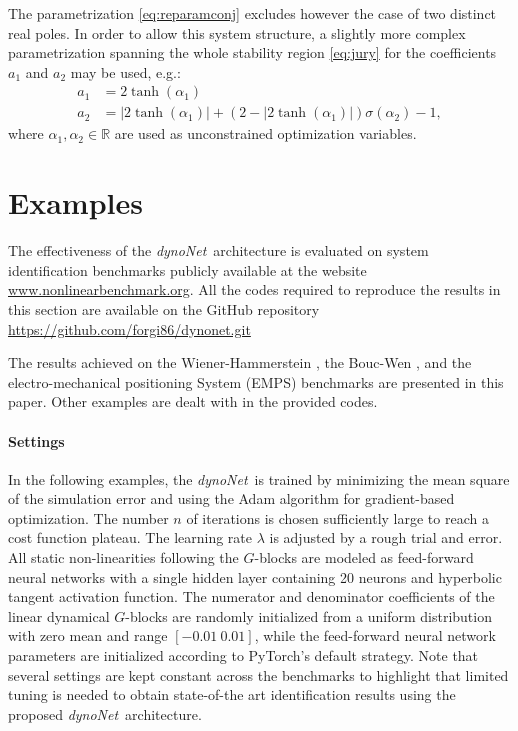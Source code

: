 \documentclass{article}
\newcommand{\ac}{a} %
\newcommand{\Name}{\emph{dynoNet}}
\begin{document}
The parametrization \eqref{eq:reparamconj} excludes however the case of two distinct real poles. 
In order to allow this system structure, a slightly more complex parametrization spanning the whole stability region \eqref{eq:jury} for the coefficients $a_1$ and $a_2$  may be used, e.g.:
\begin{subequations}
	\label{eq:reparamgen}
	\begin{align}
	\ac_1 &= 2 \tanh(\alpha_1)\\
	\ac_2 &= |2 \tanh(\alpha_1)| + (2 - |2 \tanh(\alpha_1)|)  \sigma(\alpha_2) - 1,
	\end{align}
\end{subequations}
where $\alpha_1, \alpha_2 \in \mathbb{R}$ are used as unconstrained optimization variables.


\section{Examples}
\label{sec:examples}
The effectiveness of the  \Name\ architecture is evaluated on  system identification benchmarks publicly available at the website \url{www.nonlinearbenchmark.org}.
All the codes required to reproduce the results in this section are available on the GitHub repository \url{https://github.com/forgi86/dynonet.git}

The results achieved on the Wiener-Hammerstein \cite{ljung2009wiener}, the Bouc-Wen \cite{noel2016hysteretic}, and the electro-mechanical positioning System (EMPS) \cite{janot2019data} benchmarks are presented in this paper. 
Other examples are dealt with in the provided codes.


\paragraph{Settings}
In the following examples, the \Name\ is trained by minimizing the mean square of the simulation error and  using the Adam algorithm \cite{kingma2014adam} for gradient-based optimization. The number $n$ of iterations  is chosen sufficiently large to reach a cost function plateau. The learning rate $\lambda$ is adjusted by a rough trial and error. All static non-linearities following the $G$-blocks  are modeled as feed-forward neural networks with a single hidden layer containing 20 neurons and hyperbolic tangent activation function. The numerator and denominator coefficients of the linear dynamical $G$-blocks are randomly initialized from a uniform distribution with zero mean and range $[-0.01\ 0.01]$, while the feed-forward neural network parameters are initialized according to PyTorch's default strategy. 
Note that several settings are kept constant across the benchmarks to highlight that limited tuning is needed to obtain state-of-the art identification results using the proposed \Name\ architecture.
\end{document}
